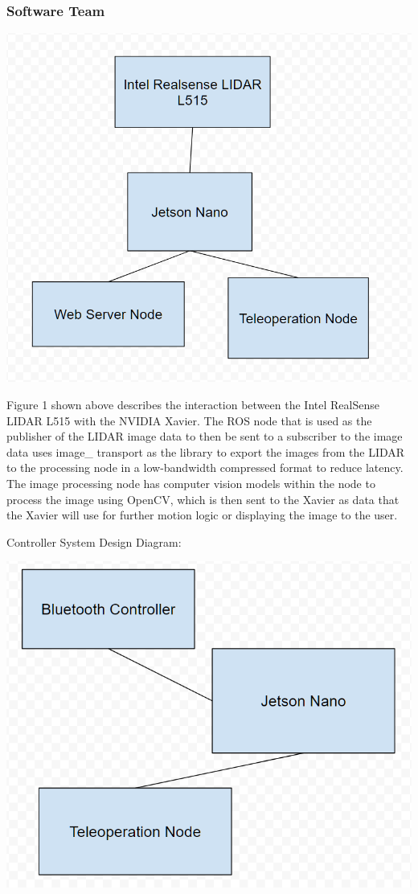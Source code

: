 \documentclass[a4paper, 10pt]{article}
\begin{document}
	
\subsubsection{Software Team}

\includegraphics[scale=0.3]{LIDAR nodes}

Figure 1 shown above describes the interaction between the Intel RealSense LIDAR L515 with the NVIDIA Xavier. The ROS node that is used as the publisher of the LIDAR image data to then be sent to a subscriber to the image data uses image\_ transport as the library to export the images from the LIDAR to the processing node in a low-bandwidth compressed format to reduce latency. The image processing node has computer vision models within the node to process the image using OpenCV, which is then sent to the Xavier as data that the Xavier will use for further motion logic or displaying the image to the user.

Controller System Design Diagram:

\includegraphics[scale=0.3]{controller node}
\end{document}
